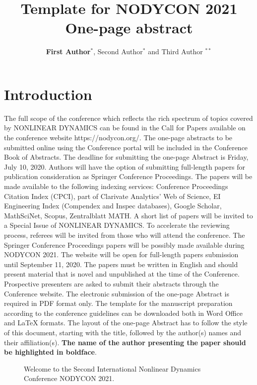 \documentclass[11pt]{nodycon2021}
\title{Template for NODYCON 2021 One-page abstract}
\author{\textbf{First Author}$^\ast$, Second Author$^\ast$ and Third Author $^{\ast\ast}$}
\begin{document}
\section{Introduction}

The full scope of the conference which reflects the rich spectrum of topics covered by NONLINEAR DYNAMICS can be found in the Call for Papers available on the conference website https://nodycon.org/. The one-page abstracts to be submitted online using the Conference portal    will be included in the Conference Book of Abstracts. The deadline for submitting the one-page Abstract is Friday, July 10, 2020.  Authors will have the option of submitting full-length papers for publication consideration as Springer Conference Proceedings. The papers will be made available to the following indexing services: Conference Proceedings Citation Index (CPCI), part of Clarivate Analytics’ Web of Science, EI Engineering Index (Compendex and Inspec databases), Google Scholar, MathSciNet, Scopus, Zentralblatt MATH. A short list of papers will be invited to a Special Issue of NONLINEAR DYNAMICS. To accelerate the reviewing process, referees will be invited from those who will attend the conference. The Springer Conference Proceedings papers will be possibly made available during NODYCON 2021. The website will be open for full-length papers submission until September 11, 2020.  The papers must be written in English and should present material that is novel and  unpublished at the time of the Conference. Prospective presenters are asked to submit their abstracts through the Conference website. The electronic submission of the one-page Abstract is required in PDF format only. The template for the manuscript preparation according to the conference guidelines can be downloaded both in Word Office and LaTeX formats. The layout of the one-page Abstract has to follow the style of this document, starting with the title, followed by the author(s) names and their affiliation(s). \textbf{The name of the author presenting the paper should be highlighted in boldface}.

\begin{figure}[h!]
\centering
{}
  \caption{Welcome to the Second International Nonlinear Dynamics Conference NODYCON 2021.}
\label{fig:Fig1}
\end{figure}
\end{document}
